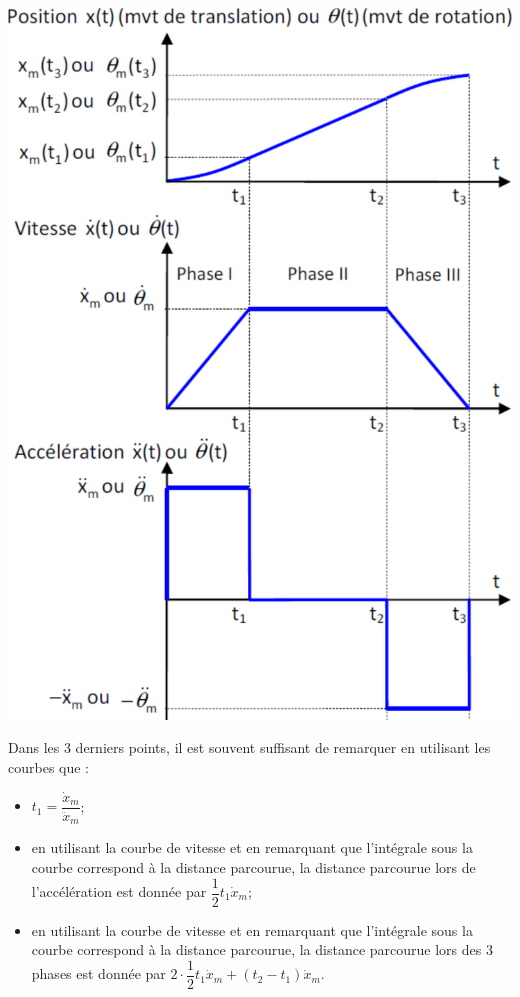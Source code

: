 \documentclass[10pt,fleqn]{article} %
\begin{document}
\begin{minipage}[c]{.48\linewidth}
\begin{center}
\includegraphics[width=.9\linewidth]{images/trapeze}
\end{center}
\end{minipage}
\begin{resultat}
Dans les 3 derniers points, il est souvent suffisant de remarquer en utilisant les courbes que : 
\begin{itemize}
\item $t_1=\dfrac{\dot{x}_m}{\ddot{x}_m}$;
\item en utilisant la courbe de vitesse et en remarquant que l'intégrale sous la courbe correspond à la distance parcourue, la distance parcourue lors de l'accélération est donnée par $\dfrac{1}{2}t_1\dot{x}_m$;
\item en utilisant la courbe de vitesse et en remarquant que l'intégrale sous la courbe correspond à la distance parcourue, la distance parcourue lors des 3 phases est donnée par $2\cdot \dfrac{1}{2}t_1\dot{x}_m+\left(t_2-t_1\right)\dot{x}_m$.
\end{itemize}
\end{resultat}
\end{document}
